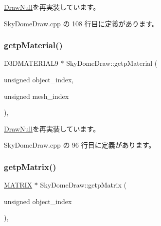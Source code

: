 \mbox{\hyperlink{class_draw_null_a2dfa2d2cbb66249f933420a38e9cadad}{Draw\+Null}}を再実装しています。



 Sky\+Dome\+Draw.\+cpp の 108 行目に定義があります。

\mbox{\label{class_sky_dome_draw_a45d3e8d70753af83c84c7a7c9193459f}} 
\subsubsection{\texorpdfstring{getp\+Material()}{getpMaterial()}}
{\footnotesize\ttfamily D3\+D\+M\+A\+T\+E\+R\+I\+A\+L9 $\ast$ Sky\+Dome\+Draw\+::getp\+Material (\begin{DoxyParamCaption}\item[{unsigned}]{object\+\_\+index,  }\item[{unsigned}]{mesh\+\_\+index }\end{DoxyParamCaption})\hspace{0.3cm}{\ttfamily [override]}, {\ttfamily [virtual]}}



\mbox{\hyperlink{class_draw_null_aa07d7e89e723b68ec257da0f63d43f70}{Draw\+Null}}を再実装しています。



 Sky\+Dome\+Draw.\+cpp の 96 行目に定義があります。

\mbox{\label{class_sky_dome_draw_accbc05d1bbde9ad9d6b7180d91e9ed89}} 
\subsubsection{\texorpdfstring{getp\+Matrix()}{getpMatrix()}}
{\footnotesize\ttfamily \mbox{\hyperlink{_vector3_d_8h_a032295cd9fb1b711757c90667278e744}{M\+A\+T\+R\+IX}} $\ast$ Sky\+Dome\+Draw\+::getp\+Matrix (\begin{DoxyParamCaption}\item[{unsigned}]{object\+\_\+index }\end{DoxyParamCaption})\hspace{0.3cm}{\ttfamily [override]}, {\ttfamily [virtual]}}



